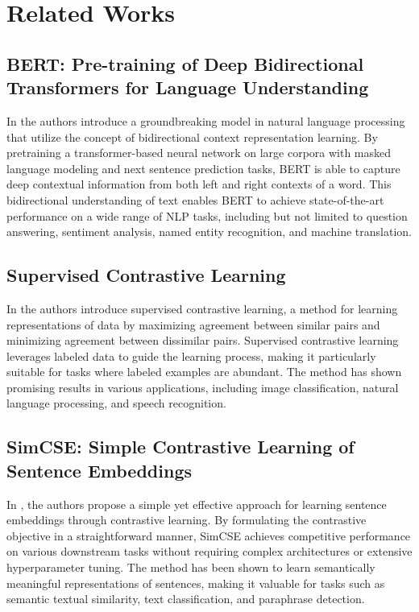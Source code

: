 \section*{Related Works}

\subsection*{BERT: Pre-training of Deep Bidirectional Transformers for Language Understanding}
In \cite{bert} the authors introduce a groundbreaking model in natural language processing that utilize the concept of bidirectional context representation learning. By pretraining a transformer-based neural network on large corpora with masked language modeling and next sentence prediction tasks, BERT is able to capture deep contextual information from both left and right contexts of a word. This bidirectional understanding of text enables BERT to achieve state-of-the-art performance on a wide range of NLP tasks, including but not limited to question answering, sentiment analysis, named entity recognition, and machine translation.

\subsection*{Supervised Contrastive Learning}
In \cite{scl} the authors introduce supervised contrastive learning, a method for learning representations of data by maximizing agreement between similar pairs and minimizing agreement between dissimilar pairs. Supervised contrastive learning leverages labeled data to guide the learning process, making it particularly suitable for tasks where labeled examples are abundant. The method has shown promising results in various applications, including image classification, natural language processing, and speech recognition.

\subsection*{SimCSE: Simple Contrastive Learning of Sentence Embeddings}
In \cite{simcse}, the authors propose a simple yet effective approach for learning sentence embeddings through contrastive learning. By formulating the contrastive objective in a straightforward manner, SimCSE achieves competitive performance on various downstream tasks without requiring complex architectures or extensive hyperparameter tuning. The method has been shown to learn semantically meaningful representations of sentences, making it valuable for tasks such as semantic textual similarity, text classification, and paraphrase detection.
